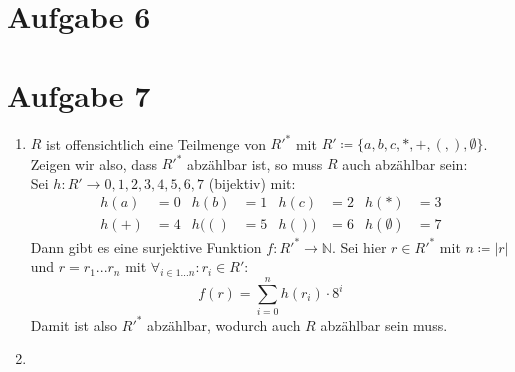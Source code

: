 \documentclass[a4paper,11pt]{scrartcl}
\begin{document}
	\newpage
	
	\section*{Aufgabe 6}
	
	\newpage
	
	\section*{Aufgabe 7}
	\begin{enumerate}[label=\alph*)]
	\item 	$R$ ist offensichtlich eine Teilmenge von ${R'}^*$ mit $R' \coloneqq \{a,b,c,*,+,(,),\emptyset \}$.\\
			Zeigen wir also, dass ${R'}^*$ abzählbar ist, so muss $R$ auch abzählbar sein:\\
			Sei $h:R'\rightarrow {0,1,2,3,4,5,6,7}$ (bijektiv) mit:
			\begin{align*}
			h(a) &= 0		&	h(b) &= 1		&	h(c) &= 2		&	h(*) &= 3	\\
			h(+) &= 4		&	h(() &= 5		&	h()) &= 6		&	h(\emptyset ) &= 7
			\end{align*}
			Dann gibt es eine surjektive Funktion $f:{R'}^* \rightarrow \mathbb{N}$. Sei hier $r \in {R'}^*$ mit $n \coloneqq \vert r \vert$ und $r = r_1 ... r_n$ mit ${\forall}_{i\in 1...n}: r_i \in R'$: \\
			\[f(r) = \sum_{i=0}^{n} h(r_i) \cdot 8^i\]
			Damit ist also ${R'}^*$ abzählbar, wodurch auch $R$ abzählbar sein muss.
			
	\item	
	
\newpage	
	

\end{enumerate}
\end{document}
